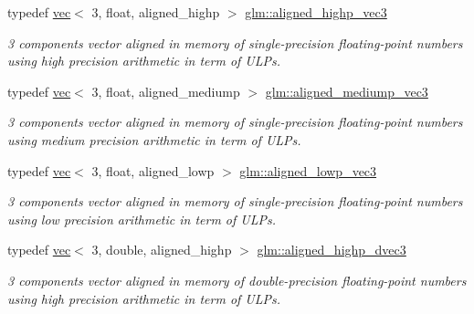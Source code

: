 \begin{DoxyCompactItemize}
typedef \hyperlink{structglm_1_1vec}{vec}$<$ 3, float, aligned\+\_\+highp $>$ \hyperlink{group__gtc__type__aligned_ga9ddb18aa4936b5aa354fcefe179675af}{glm\+::aligned\+\_\+highp\+\_\+vec3}
\begin{DoxyCompactList}\small\item\em 3 components vector aligned in memory of single-\/precision floating-\/point numbers using high precision arithmetic in term of U\+L\+Ps. \end{DoxyCompactList}\item 
\mbox{\label{group__gtc__type__aligned_ga1c5c37a497fa004afa060bd173b20447}} 
typedef \hyperlink{structglm_1_1vec}{vec}$<$ 3, float, aligned\+\_\+mediump $>$ \hyperlink{group__gtc__type__aligned_ga1c5c37a497fa004afa060bd173b20447}{glm\+::aligned\+\_\+mediump\+\_\+vec3}
\begin{DoxyCompactList}\small\item\em 3 components vector aligned in memory of single-\/precision floating-\/point numbers using medium precision arithmetic in term of U\+L\+Ps. \end{DoxyCompactList}\item 
\mbox{\label{group__gtc__type__aligned_ga74eb3cf8a9ff6234da5d26f9203e179d}} 
typedef \hyperlink{structglm_1_1vec}{vec}$<$ 3, float, aligned\+\_\+lowp $>$ \hyperlink{group__gtc__type__aligned_ga74eb3cf8a9ff6234da5d26f9203e179d}{glm\+::aligned\+\_\+lowp\+\_\+vec3}
\begin{DoxyCompactList}\small\item\em 3 components vector aligned in memory of single-\/precision floating-\/point numbers using low precision arithmetic in term of U\+L\+Ps. \end{DoxyCompactList}\item 
\mbox{\label{group__gtc__type__aligned_gafb21f8db25007665c2cb2a9b250471aa}} 
typedef \hyperlink{structglm_1_1vec}{vec}$<$ 3, double, aligned\+\_\+highp $>$ \hyperlink{group__gtc__type__aligned_gafb21f8db25007665c2cb2a9b250471aa}{glm\+::aligned\+\_\+highp\+\_\+dvec3}
\begin{DoxyCompactList}\small\item\em 3 components vector aligned in memory of double-\/precision floating-\/point numbers using high precision arithmetic in term of U\+L\+Ps. \end{DoxyCompactList}\item 

\end{DoxyCompactItemize}
